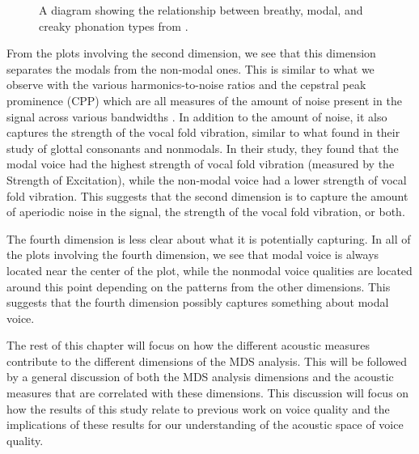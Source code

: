 \begin{figure}[h!]
    \centering
    \caption{A diagram showing the relationship between breathy, modal, and creaky phonation types from \citet{gordonPhonationTypesCrosslinguistic2001}.}
    \label{fig:phonation_types}
\end{figure}

From the plots involving the second dimension, we see that this dimension separates the modals from the non-modal ones. This is similar to what we observe with the various harmonics-to-noise ratios and the cepstral peak prominence (CPP) which are all measures of the amount of noise present in the signal across various bandwidths \citep{dekromCepstrumBasedTechniqueDetermining1993,hillenbrandAcousticCorrelatesBreathy1996,blankenshipTimingNonmodalPhonation2002,ferrerriesgoWhatMakesCepstral2020}. In addition to the amount of noise, it also captures the strength of the vocal fold vibration, similar to what \citet{garellekVoicingGlottalConsonants2021} found in their study of glottal consonants and nonmodals. In their study, they found that the modal voice had the highest strength of vocal fold vibration (measured by the Strength of Excitation), while the non-modal voice had a lower strength of vocal fold vibration. This suggests that the second dimension is to capture the amount of aperiodic noise in the signal, the strength of the vocal fold vibration, or both.

The fourth dimension is less clear about what it is potentially capturing. In all of the plots involving the fourth dimension, we see that modal voice is always located near the center of the plot, while the nonmodal voice qualities are located around this point depending on the patterns from the other dimensions. This suggests that the fourth dimension possibly captures something about modal voice. 

The rest of this chapter will focus on how the different acoustic measures contribute to the different dimensions of the MDS analysis. This will be followed by a general discussion of both the MDS analysis dimensions and the acoustic measures that are correlated with these dimensions. This discussion will focus on how the results of this study relate to previous work on voice quality and the implications of these results for our understanding of the acoustic space of voice quality. 

